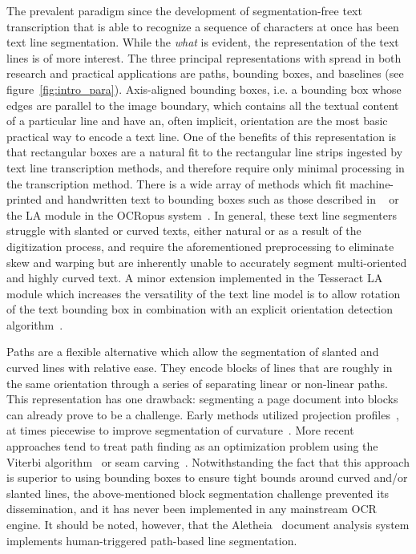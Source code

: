 The prevalent paradigm since the development of segmentation-free text
transcription that is able to recognize a sequence of characters at once has
been text line segmentation. While the \emph{what} is evident, the
representation of the text lines is of more interest. The three principal
representations with spread in both research and practical applications are
paths, bounding boxes, and baselines (see figure~\ref{fig:intro_para}).
Axis-aligned bounding boxes, i.e. a bounding box whose edges are parallel to
the image boundary, which contains all the textual content of a particular line
and have an, often implicit, orientation are the most basic practical way to
encode a text line.  One of the benefits of this representation is that
rectangular boxes are a natural fit to the rectangular line strips ingested by
text line transcription methods, and therefore require only minimal processing
in the transcription method. There is a wide array of methods which fit
machine-printed and handwritten text to bounding boxes such as those described
in ~\cite{marti2001influence,papavassiliou2010handwritten} or the LA module in
the OCRopus system~\cite{Breuel03highperformance}. In general, these text line
segmenters struggle with slanted or curved texts, either natural or as a result
of the digitization process, and require the aforementioned preprocessing to
eliminate skew and warping but are inherently unable to accurately segment
multi-oriented and highly curved text. A minor extension implemented in the
Tesseract LA module which increases the versatility of the text line model is
to allow rotation of the text bounding box in combination with an explicit
orientation detection algorithm~\cite{smith2007overview}.

Paths are a flexible alternative which allow the segmentation of slanted and
curved lines with relative ease. They encode blocks of lines that are roughly
in the same orientation through a series of separating linear or non-linear
paths. This representation has one drawback: segmenting a page document into
blocks can already prove to be a challenge. Early methods utilized projection
profiles~\cite{antonacopoulos2004document}, at times piecewise to improve
segmentation of curvature~\cite{zahour2001arabic}. More recent approaches tend
to treat path finding as an optimization problem using the Viterbi
algorithm~\cite{tseng1999recognition} or seam carving~\cite{arvanitopoulos2014seam,zhang2014text}. Notwithstanding the fact that this
approach is superior to using bounding boxes to ensure tight bounds around
curved and/or slanted lines, the above-mentioned block segmentation challenge
prevented its dissemination, and it has never been implemented in any
mainstream OCR engine. It should be noted, however, that the
Aletheia~\cite{6065274} document analysis system implements human-triggered
path-based line segmentation.

